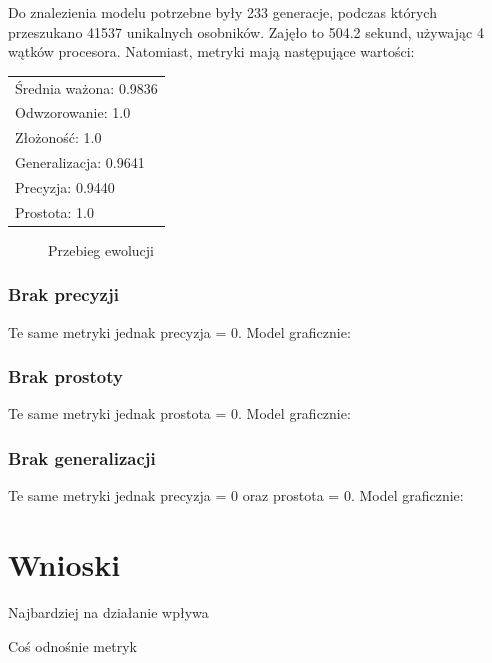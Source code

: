 Do znalezienia modelu potrzebne były 233 generacje, podczas których przeszukano 41537 unikalnych osobników. Zajęło to 504.2 sekund, używając 4 wątków procesora. Natomiast, metryki mają następujące wartości: 

 \begin{center}
  \begin{tabular}{l}
	Średnia ważona: 0.9836 \\
	Odwzorowanie: 1.0 \\
	Złożoność: 1.0 \\
	Generalizacja: 0.9641 \\
	Precyzja: 0.9440 \\
	Prostota: 1.0
  \end{tabular}
 \end{center}
 
\begin{figure}[!ht]
	\caption{\label{fig:flow_chart}Przebieg ewolucji}
\end{figure}

\subsubsection{Brak precyzji}
Te same metryki jednak precyzja = 0.
Model graficznie:
\subsubsection{Brak prostoty}
Te same metryki jednak prostota = 0.
Model graficznie:
\subsubsection{Brak generalizacji}
Te same metryki jednak precyzja = 0 oraz prostota = 0.
Model graficznie:
\section{Wnioski}
Najbardziej na działanie wpływa

Coś odnośnie metryk
